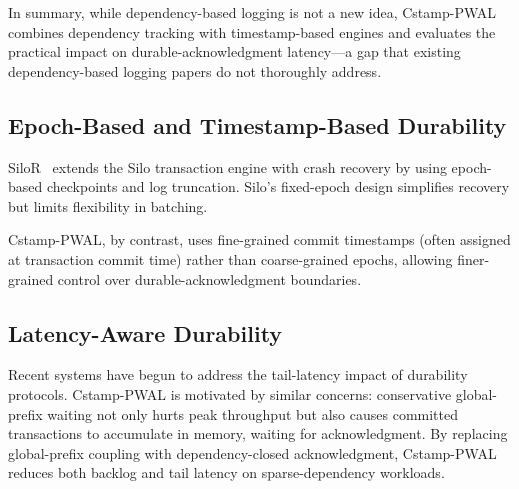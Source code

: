 In summary, while dependency-based logging is not a new idea, Cstamp-PWAL
combines dependency tracking with timestamp-based engines and evaluates the
practical impact on durable-acknowledgment latency---a gap that existing
dependency-based logging papers do not thoroughly address.

\subsection{Epoch-Based and Timestamp-Based Durability}

SiloR~\cite{SiloR} extends the Silo transaction engine with crash recovery by
using epoch-based checkpoints and log truncation.  Silo's fixed-epoch design
simplifies recovery but limits flexibility in batching.

Cstamp-PWAL, by contrast, uses fine-grained commit timestamps (often assigned at
transaction commit time) rather than coarse-grained epochs, allowing finer-
grained control over durable-acknowledgment boundaries.

\subsection{Latency-Aware Durability}

Recent systems have begun to address the tail-latency impact of durability
protocols.  Cstamp-PWAL is motivated by similar concerns: conservative global-
prefix waiting not only hurts peak throughput but also causes committed
transactions to accumulate in memory, waiting for acknowledgment.  By replacing
global-prefix coupling with dependency-closed acknowledgment, Cstamp-PWAL
reduces both backlog and tail latency on sparse-dependency workloads.

